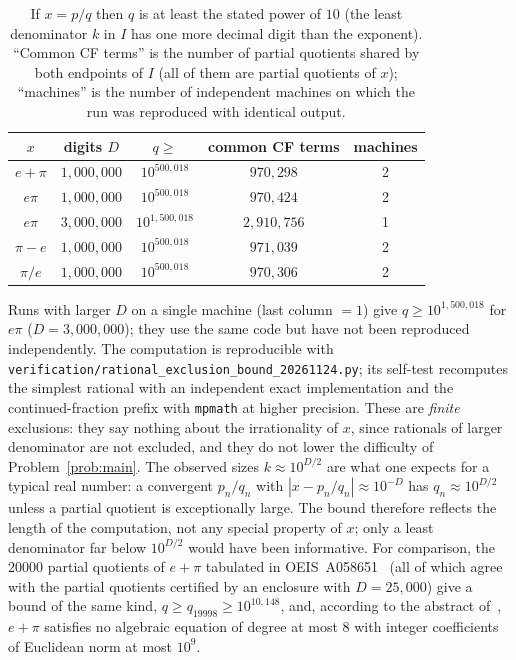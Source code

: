 \documentclass[11pt]{amsart}
\theoremstyle{definition}
\theoremstyle{remark}
\numberwithin{equation}{section}
\begin{document}
\begin{table}[ht]
\centering\small
\begin{tabular}{c|c|c|c|c}
$x$ & digits $D$ & $q\ge$ & common CF terms & machines \\\hline
$e+\pi$ & $1{,}000{,}000$ & $10^{500{,}018}$ & $970{,}298$ & 2 \\
$e\pi$ & $1{,}000{,}000$ & $10^{500{,}018}$ & $970{,}424$ & 2 \\
$e\pi$ & $3{,}000{,}000$ & $10^{1{,}500{,}018}$ & $2{,}910{,}756$ & 1 \\
$\pi-e$ & $1{,}000{,}000$ & $10^{500{,}018}$ & $971{,}039$ & 2 \\
$\pi/e$ & $1{,}000{,}000$ & $10^{500{,}018}$ & $970{,}306$ & 2 \\
\end{tabular}
\caption{If $x=p/q$ then $q$ is at least the stated power of $10$ (the least denominator $k$ in $I$ has one more decimal digit than the exponent). ``Common CF terms'' is the number of
partial quotients shared by both endpoints of $I$ (all of them are partial quotients of $x$);
``machines'' is the number of independent machines on which the run was reproduced with
identical output.}
\label{tab:denominator-bounds}
\end{table}

\noindent Runs with larger $D$ on a single machine (last column $=1$) give $q\ge10^{1{,}500{,}018}$ for $e\pi$ ($D=3{,}000{,}000$); they use the same code but have not been reproduced independently. The computation is reproducible with
\texttt{verification/\allowbreak rational\_\allowbreak exclusion\_\allowbreak bound\_\allowbreak 20261124.py};
its self-test recomputes the simplest rational with an independent exact implementation and the
continued-fraction prefix with \texttt{mpmath} at higher precision. These are \emph{finite}
exclusions: they say nothing about the irrationality of $x$, since rationals of larger
denominator are not excluded, and they do not lower the difficulty of
Problem~\ref{prob:main}. The observed sizes $k\approx10^{D/2}$ are what one expects for a
typical real number: a convergent $p_n/q_n$ with $|x-p_n/q_n|\approx10^{-D}$ has
$q_n\approx10^{D/2}$ unless a partial quotient is exceptionally large. The bound therefore
reflects the length of the computation, not any special property of $x$; only a least
denominator far below $10^{D/2}$ would have been informative. For comparison, the $20000$ partial quotients of $e+\pi$ tabulated in
OEIS~A058651~\cite{OEISA058651} (all of which agree with the partial quotients certified by an
enclosure with $D=25{,}000$) give a bound of the same kind, $q\ge q_{19998}\ge10^{10{,}148}$, and, according to the abstract
of~\cite{Bailey1988}, $e+\pi$ satisfies no algebraic equation of degree at most $8$ with
integer coefficients of Euclidean norm at most $10^{9}$.
\end{document}
